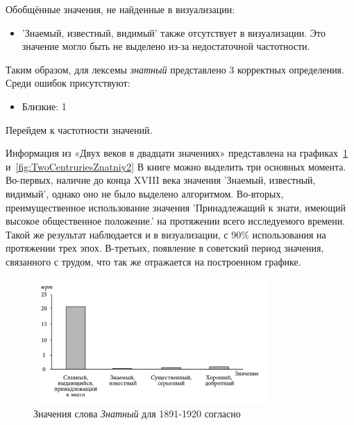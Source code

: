 Обобщённые значения, не найденные в визуализации:
\begin{itemize}
    \item ’Знаемый, известный, видимый’ также отсутствует в визуализации.
Это значение могло быть не выделено из-за недостаточной частотности.
\end{itemize}

Таким образом, для лексемы \textit{знатный} представлено 3 корректных определения.
Среди ошибок присутствуют:
\begin{itemize}
    \item Близкие: 1
\end{itemize}

Перейдем к частотности значений.

Информация из «Двух веков в двадцати значениях» представлена на графиках~\ref{fig:TwoCentruriesZnatniy1} и~\ref{fig:TwoCentruriesZnatniy2}
В книге можно выделить три основных момента.
Во-первых, наличие до конца XVIII века значения ’Знаемый, известный, видимый’,
однако оно не было выделено алгоритмом.
Во-вторых, преимущественное использование значения
’Принадлежащий к знати, имеющий высокое общественное положение.’ на протяжении
всего исследуемого времени.
Такой же результат наблюдается и в визуализации, с 90\% использования на протяжении трех эпох.
В-третьих, появление в советский период значения, связанного с трудом,
что так же отражается на построенном графике.

\noindent %
\begin{figure}[H]
    \centering %
    \includegraphics[width=0.8\textwidth]{img/book/znatnij/1891-1920}
    \caption{Значения слова \textit{Знатный} для 1891-1920 согласно~\cite{TwoCenturies}}
    \label{fig:TwoCentruriesZnatniy1}
\end{figure}


